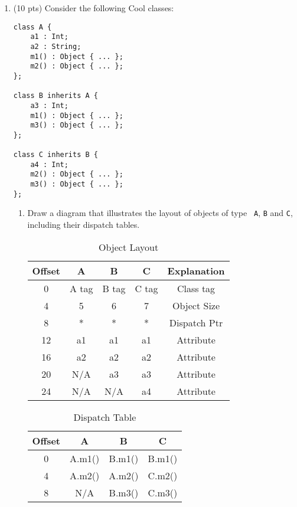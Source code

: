 \documentclass[10pt]{article}
\begin{document}
\begin{enumerate}

\item (10 pts)
Consider the following Cool classes:

\begin{center}
\begin{minipage}{6cm}
\begin{verbatim}
class A {
    a1 : Int;
    a2 : String;
    m1() : Object { ... };
    m2() : Object { ... };
};

class B inherits A {
    a3 : Int;
    m1() : Object { ... };
    m3() : Object { ... };
};

class C inherits B {
    a4 : Int;
    m2() : Object { ... };
    m3() : Object { ... };
};
\end{verbatim}
\end{minipage}
\end{center}
\begin{enumerate}

\item Draw a diagram that illustrates the layout of objects of type {\tt
A}, {\tt B} and {\tt C}, including their dispatch tables.

\begin{table}[ht]
	\centering
	\caption{Object Layout}
	\begin{tabular}{|c|c|c|c|c|}                         \hline
		Offset & A     & B     & C     & Explanation  \\ \hline
		0      & A tag & B tag & C tag & Class tag    \\ \hline
		4      & 5     & 6     & 7     & Object Size  \\ \hline
		8      & *     & *     & *     & Dispatch Ptr \\ \hline
		12     & a1    & a1    & a1    & Attribute    \\ \hline
		16     & a2    & a2    & a2    & Attribute    \\ \hline
		20     & N/A   & a3    & a3    & Attribute    \\ \hline
		24     & N/A   & N/A   & a4    & Attribute    \\ \hline
	\end{tabular}
\end{table}

\begin{table}[ht]
	\centering
	\caption{Dispatch Table}
	\begin{tabular}{|c|c|c|c|}               \hline
		Offset & A      & B      & C      \\ \hline
		0      & A.m1() & B.m1() & B.m1() \\ \hline
		4      & A.m2() & A.m2() & C.m2() \\ \hline
		8      &  N/A   & B.m3() & C.m3() \\ \hline
	\end{tabular}
\end{table}


\end{enumerate}
\end{enumerate}
\end{document}
